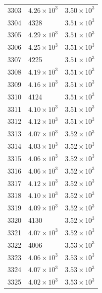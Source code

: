 \begin{table}[H]
\begin{tabular}{lll}
3303 & $\displaystyle 4.26 \times 10^{3}$ & $\displaystyle 3.50 \times 10^{3}$ \\
3304 & 4328 & $\displaystyle 3.51 \times 10^{3}$ \\
3305 & $\displaystyle 4.29 \times 10^{3}$ & $\displaystyle 3.51 \times 10^{3}$ \\
3306 & $\displaystyle 4.25 \times 10^{3}$ & $\displaystyle 3.51 \times 10^{3}$ \\
3307 & 4225 & $\displaystyle 3.51 \times 10^{3}$ \\
3308 & $\displaystyle 4.19 \times 10^{3}$ & $\displaystyle 3.51 \times 10^{3}$ \\
3309 & $\displaystyle 4.16 \times 10^{3}$ & $\displaystyle 3.51 \times 10^{3}$ \\
3310 & 4124 & $\displaystyle 3.51 \times 10^{3}$ \\
3311 & $\displaystyle 4.10 \times 10^{3}$ & $\displaystyle 3.51 \times 10^{3}$ \\
3312 & $\displaystyle 4.12 \times 10^{3}$ & $\displaystyle 3.51 \times 10^{3}$ \\
3313 & $\displaystyle 4.07 \times 10^{3}$ & $\displaystyle 3.52 \times 10^{3}$ \\
3314 & $\displaystyle 4.03 \times 10^{3}$ & $\displaystyle 3.52 \times 10^{3}$ \\
3315 & $\displaystyle 4.06 \times 10^{3}$ & $\displaystyle 3.52 \times 10^{3}$ \\
3316 & $\displaystyle 4.06 \times 10^{3}$ & $\displaystyle 3.52 \times 10^{3}$ \\
3317 & $\displaystyle 4.12 \times 10^{3}$ & $\displaystyle 3.52 \times 10^{3}$ \\
3318 & $\displaystyle 4.10 \times 10^{3}$ & $\displaystyle 3.52 \times 10^{3}$ \\
3319 & $\displaystyle 4.09 \times 10^{3}$ & $\displaystyle 3.52 \times 10^{3}$ \\
3320 & 4130 & $\displaystyle 3.52 \times 10^{3}$ \\
3321 & $\displaystyle 4.07 \times 10^{3}$ & $\displaystyle 3.52 \times 10^{3}$ \\
3322 & 4006 & $\displaystyle 3.53 \times 10^{3}$ \\
3323 & $\displaystyle 4.06 \times 10^{3}$ & $\displaystyle 3.53 \times 10^{3}$ \\
3324 & $\displaystyle 4.07 \times 10^{3}$ & $\displaystyle 3.53 \times 10^{3}$ \\
3325 & $\displaystyle 4.02 \times 10^{3}$ & $\displaystyle 3.53 \times 10^{3}$ \\

\end{tabular}
\end{table}
